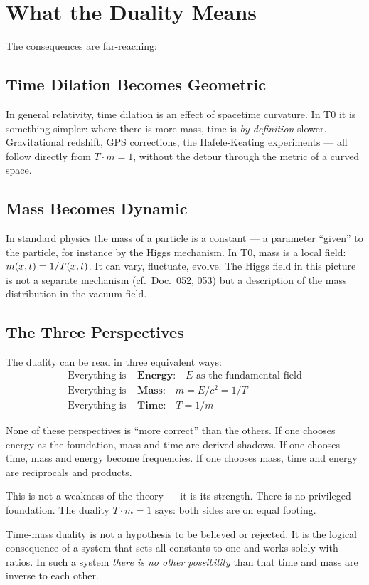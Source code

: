 \section{What the Duality Means}

The consequences are far-reaching:

\subsection{Time Dilation Becomes Geometric}

In general relativity, time dilation is an effect of spacetime curvature. In T0 it is something simpler: where there is more mass, time is \emph{by definition} slower. Gravitational redshift, GPS corrections, the Hafele-Keating experiments --- all follow directly from $T \cdot m = 1$, without the detour through the metric of a curved space.

\subsection{Mass Becomes Dynamic}

In standard physics the mass of a particle is a constant --- a parameter ``given'' to the particle, for instance by the Higgs mechanism. In T0, mass is a local field: $m(x,t) = 1/T(x,t)$. It can vary, fluctuate, evolve. The Higgs field in this picture is not a separate mechanism (cf.\ \href{https://github.com/jpascher/T0-Time-Mass-Duality/blob/main/2/pdf/052_EliminationOfMass_De.pdf}{Doc.~052}, 053) but a description of the mass distribution in the vacuum field.

\subsection{The Three Perspectives}

The duality can be read in three equivalent ways:
\begin{align}
\text{Everything is } &\textbf{Energy:} \quad E \text{ as the fundamental field} \\
\text{Everything is } &\textbf{Mass:} \quad m = E/c^2 = 1/T \\
\text{Everything is } &\textbf{Time:} \quad T = 1/m
\end{align}

None of these perspectives is ``more correct'' than the others. If one chooses energy as the foundation, mass and time are derived shadows. If one chooses time, mass and energy become frequencies. If one chooses mass, time and energy are reciprocals and products.

This is not a weakness of the theory --- it is its strength. There is no privileged foundation. The duality $T \cdot m = 1$ says: both sides are on equal footing.

\begin{kerngedanke}
Time-mass duality is not a hypothesis to be believed or rejected. It is the logical consequence of a system that sets all constants to one and works solely with ratios. In such a system \emph{there is no other possibility} than that time and mass are inverse to each other.
\end{kerngedanke}
